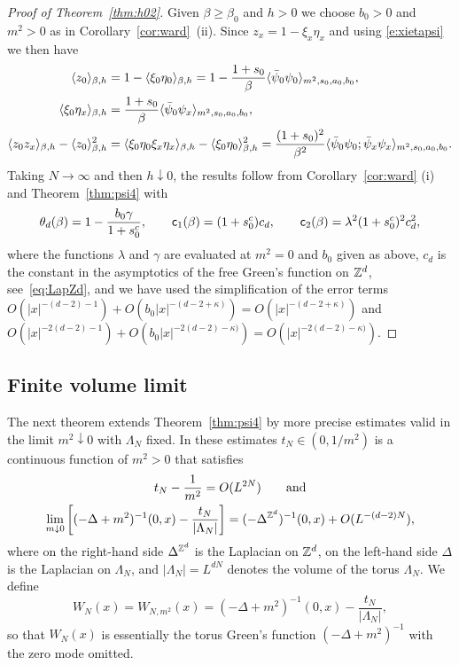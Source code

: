 \documentclass[11pt]{amsart}
\numberwithin{equation}{section}
\numberwithin{theorem}{section}
\newcommand{\1}{{\bf 1}}
\newcommand{\consta}{{\sf c}_1}
\newcommand{\constb}{{\sf c}_2}
\newcommand{\clambda}{\lambda}
\newcommand{\cgamma}{\gamma}
\begin{document}
\begin{proof}[Proof of Theorem~\ref{thm:h02}]
  Given $\beta \geq \beta_0$ and $h>0$ we choose $b_0>0$ and $m^2>0$ as in Corollary~\ref{cor:ward}~(ii).
  Since $z_x = 1-\xi_x\eta_x$ and using \eqref{e:xietapsi}
  we then have
  \begin{align}
    \langle z_0 \rangle_{\beta,h}
    &= 1-\langle \xi_0\eta_0 \rangle_{\beta,h}
      =
      1- \frac{1+s_0}{\beta} \langle \bar\psi_0\psi_0 \rangle_{m^2,s_0,a_0,b_0},
    \\
    \langle \xi_0\eta_x \rangle_{\beta,h}
    &= \frac{1+s_0}{\beta} \langle \bar\psi_0\psi_x \rangle_{m^2,s_0,a_0,b_0},
    \\
    \langle z_0z_x \rangle_{\beta,h}-\langle z_0 \rangle_{\beta,h}^2
    &= \langle \xi_0\eta_0\xi_x\eta_x \rangle_{\beta,h} - \langle \xi_0\eta_0 \rangle_{\beta,h}^2
    = \frac{(1+s_0)^2}{\beta^2} \langle \bar\psi_0\psi_0;\bar\psi_x\psi_x \rangle_{m^2,s_0,a_0,b_0} 
      .
  \end{align}
  Taking $N\to\infty$ and then $h\downarrow 0$, the results follow
  from Corollary~\ref{cor:ward} (i) and Theorem~\ref{thm:psi4} with
  \begin{equation} \label{e:constants}
    \theta_d(\beta) = 1- \frac{b_0\cgamma}{1+s_0^c},
    \qquad
    \consta(\beta) = (1+s_0^c)c_d,
    \qquad
    \constb(\beta) = \clambda^{2} (1+s_0^c)^2 c_d^2,
  \end{equation}
  where the functions $\lambda$ and $\cgamma$ are evaluated at $m^2=0$
  and $b_0$ given as above, $c_d$ is the constant in the
  asymptotics of the free Green's function on $\mathbb{Z}^{d}$,
  see~\eqref{eq:LapZd}, and we have used the simplification of the error
  terms
  $O(|x|^{-(d-2)-1})+O(b_0 |x|^{-(d-2+\kappa)}) = O(|x|^{-(d-2+\kappa)})$
  and
  $O(|x|^{-2(d-2)-1})+O(b_0 |x|^{-2(d-2)-\kappa)}) = O(|x|^{-2(d-2)-\kappa)})$.
\end{proof}


\subsection{Finite volume limit}
\label{sec:finvol}

The next theorem extends Theorem~\ref{thm:psi4} by more precise
estimates valid in the limit $m^2\downarrow 0$ with $\Lambda_N$ fixed.
In these estimates $t_N \in (0,1/m^{2})$ is a continuous function of $m^2>0$ that
satisfies
\begin{gather}
  \label{e:tn}
  t_{N}-\frac{1}{m^{2}} = O(L^{2N})
  \qquad \text{and}
  \\
  \label{e:greenfLambdaZd}
  \lim_{m\downarrow 0}\left[{ (-\Delta+m^2)^{-1}(0,x) - \frac{t_N}{|\Lambda_N|}}\right]
  = (-\Delta^{\mathbb{Z}^d})^{-1}(0,x) + O(L^{-(d-2)N}),
\end{gather}
where on the right-hand side $\Delta^{\mathbb{Z}^d}$ is the Laplacian on
$\mathbb{Z}^d$, on the left-hand side $\Delta$ is the Laplacian on
$\Lambda_N$, and $|\Lambda_N| = L^{dN}$ denotes the volume of the
torus $\Lambda_N$.  We define
\begin{equation}
  \label{e:WN-def}
  W_N(x) = W_{N,m^2}(x) = (-\Delta+m^2)^{-1}(0,x) - \frac{t_N}{|\Lambda_N|},
\end{equation}
so that $W_N(x)$ is essentially the torus Green's function $(-\Delta+m^2)^{-1}$ with the zero mode omitted.
\end{document}

